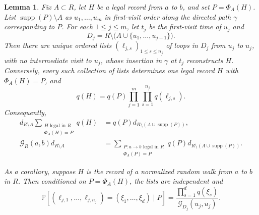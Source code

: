 \documentclass[11pt]{article}
\numberwithin{equation}{section}
\newcommand{\1}{\mathbf{1}}
\newtheorem{lemma}[theorem]{Lemma}
\newcommand{\supp}{\operatorname{supp}}
\newcommand{\Prob}{\mathbb P}
\newcommand{\Gc}{\mathcal G}
\begin{document}
\begin{lemma}\label{lem:one-step}
Fix $A\subset R$,  let $H$ be a legal record from $a$ to $b$, and set
$P=\Phi_A(H)$.  List $\supp(P)\setminus A$ as $u_1,\ldots,u_m$ in first-visit
order along the directed path $\gamma$ corresponding to $P$. For each $1\le j\le m$, let $t_j$ be the first-visit time of $u_j$
and
\[
 D_j=R\setminus\bigl(A\cup\{u_1,\ldots,u_{j-1}\}\bigr).
\]
Then there are unique ordered lists $(\ell_{j,s})_{1\le s\le n_j}$ of loops in
$D_j$ from $u_j$ to $u_j$, with no intermediate visit to $u_j$, whose insertion
in $\gamma$ at $t_j$ reconstructs $H$.  Conversely, every such collection of lists determines one legal
record $H$ with $\Phi_A(H)=P$, and
\begin{equation}\label{eq:positive-fiber-weight}
 q(H)=q(P)\prod_{j=1}^m\prod_{s=1}^{n_j}q(\ell_{j,s}).
\end{equation}
Consequently,
\begin{align}
 d_{R\setminus A}
 \sum_{\substack{H\text{ legal in }R\\\Phi_A(H)=P}}q(H)
 &=q(P)d_{R\setminus(A\cup\supp(P))},\label{eq:fiber}\\
 \Gc_R(a,b)d_{R\setminus A}
 &=\sum_{\substack{P:a\to b\text{ legal in }R\\\Phi_A(P)=P}}
 q(P)d_{R\setminus(A\cup\supp(P))}.\label{eq:one-step}
\end{align}

As a corollary, suppose $H$ is the record of a normalized random walk from $a$ to $b$ in $R$. Then conditioned on $P=\Phi_A(H)$, the lists are
independent and
\begin{equation}\label{eq:rooted-walk-law}
 \Prob[(\ell_{j,1},\ldots,\ell_{j,n_j})=(\xi_1,\ldots,\xi_d)\mid P]
 =\frac{\prod_{s=1}^d q(\xi_s)}{\Gc_{D_j}(u_j,u_j)}.
\end{equation}
\end{lemma}
\end{document}
